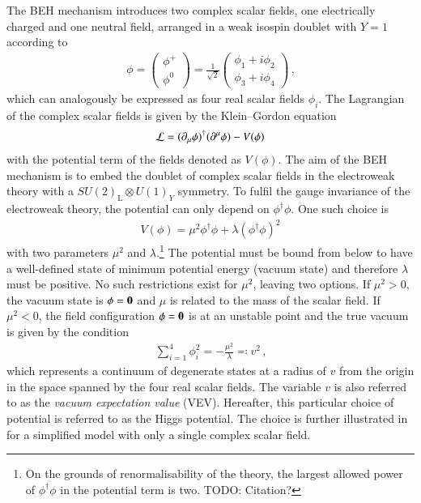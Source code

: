 The BEH mechanism introduces two complex scalar fields, one electrically charged
and one neutral field, arranged in a weak isospin doublet with $Y = 1$ according
to
\begin{align*}
  \phi =
  \begin{pmatrix}
    \phi^+ \\
    \phi^0
  \end{pmatrix}
  = \frac{1}{\sqrt{2}}
  \begin{pmatrix}
    \phi_1 + i \phi_2 \\
    \phi_3 + i \phi_4
  \end{pmatrix} \,\text{,}
\end{align*}
which can analogously be expressed as four real scalar fields $\phi_i$. The
Lagrangian of the complex scalar fields is given by the Klein--Gordon equation
\begin{align*}
  \mathcal{L} = (\partial_\mu \phi)^\dagger (\partial^\mu \phi) - V(\phi)
\end{align*}
with the potential term of the fields denoted as $V(\phi)$. The aim of the BEH
mechanism is to embed the doublet of complex scalar fields in the electroweak
theory with a $SU(2)_{\text{L}}\otimes U(1)_Y$ symmetry. To fulfil the gauge
invariance of the electroweak theory, the potential can only depend on
$\phi^\dagger \phi$. One such choice is
\begin{align}
  V(\phi) = \mu^2 \phi^\dagger \phi + \lambda (\phi^\dagger \phi)^2
  \label{eq:higgs_potential}
\end{align}
with two parameters $\mu^2$ and $\lambda$.\footnote{On the grounds of
  renormalisability of the theory, the largest allowed power of
  $\phi^\dagger \phi$ in the potential term is two. TODO: Citation?} The
potential must be bound from below to have a well-defined state of minimum
potential energy (vacuum state) and therefore $\lambda$ must be positive. No
such restrictions exist for $\mu^2$, leaving two options. If $\mu^2 > 0$, the
vacuum state is $\phi = \myvec{0}$ and $\mu$ is related to the mass of the
scalar field. If $\mu^2 < 0$, the field configuration $\phi = \myvec{0}$ is at
an unstable point and the true vacuum is given by the condition
\begin{align*}
  \sum_{i = 1}^4 \phi_i^2 = -\frac{\mu^2}{\lambda} \eqqcolon v^2 \,\text{,}
\end{align*}
which represents a continuum of degenerate states at a radius of $v$ from the
origin in the space spanned by the four real scalar fields. The variable $v$ is
also referred to as the \emph{vacuum expectation value} (VEV). Hereafter, this
particular choice of potential is referred to as the Higgs potential. The choice
is further illustrated in  for a simplified model with
only a single complex scalar field.

